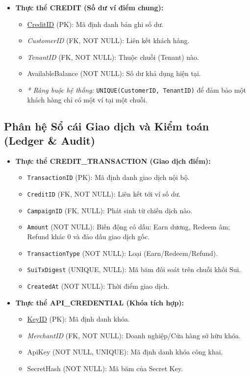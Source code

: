 \begin{itemize}
    \item \textbf{Thực thể CREDIT (Số dư ví điểm chung):}
    \begin{itemize}
        \item \underline{CreditID} (PK): Mã định danh bản ghi số dư.
        \item \textit{CustomerID} (FK, NOT NULL): Liên kết khách hàng.
        \item \textit{TenantID} (FK, NOT NULL): Thuộc chuỗi (Tenant) nào.
        \item AvailableBalance (NOT NULL): Số dư khả dụng hiện tại.
        \item \textit{* Ràng buộc hệ thống:} \texttt{UNIQUE(CustomerID, TenantID)} để đảm bảo một khách hàng chỉ có một ví tại một chuỗi.
    \end{itemize}
\end{itemize}

\subsection{Phân hệ Sổ cái Giao dịch và Kiểm toán (Ledger \& Audit)}
\begin{itemize}
    \item \textbf{Thực thể CREDIT\_TRANSACTION (Giao dịch điểm):}
    \begin{itemize}
        \item \texttt{TransactionID} (PK): Mã định danh giao dịch nội bộ.
        \item \texttt{CreditID} (FK, NOT NULL): Liên kết tới ví số dư.
        \item \texttt{CampaignID} (FK, NULL): Phát sinh từ chiến dịch nào.
        \item \texttt{Amount} (NOT NULL): Biến động có dấu: Earn dương, Redeem âm; Refund khác 0 và đảo dấu giao dịch gốc.
        \item \texttt{TransactionType} (NOT NULL): Loại (Earn/Redeem/Refund).
        \item \texttt{SuiTxDigest} (UNIQUE, NULL): Mã băm đối soát trên chuỗi khối Sui.
        \item \texttt{CreatedAt} (NOT NULL): Thời điểm giao dịch.
    \end{itemize}
    
    \item \textbf{Thực thể API\_CREDENTIAL (Khóa tích hợp):}
    \begin{itemize}
        \item \underline{KeyID} (PK): Mã định danh khóa.
        \item \textit{MerchantID} (FK, NOT NULL): Doanh nghiệp/Cửa hàng sở hữu khóa.
        \item ApiKey (NOT NULL, UNIQUE): Mã định danh khóa công khai.
        \item SecretHash (NOT NULL): Mã băm của Secret Key.
    \end{itemize}
\end{itemize}